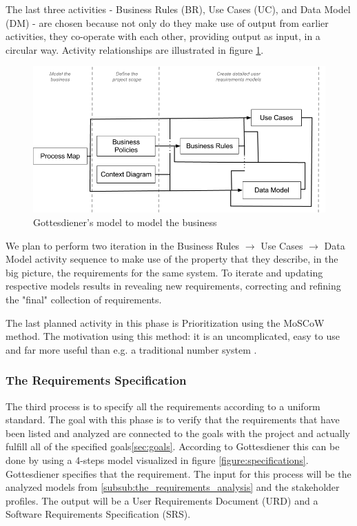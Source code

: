 \documentclass[a4paper]{article}
\begin{document}
     The last three activities - Business Rules (BR), Use Cases (UC), and Data Model (DM) - are chosen because not only do they make use of output from earlier activities, they co-operate with each other, providing output as input, in a circular way. Activity relationships are illustrated in figure \ref{figure:business}.
     
\begin{figure}[H]
	\centering
		\includegraphics[width=1\textwidth]{images/model_the_business.png}
	\caption{Gottesdiener's model to model the business \cite{gott4}}
	\label{figure:business}
\end{figure}
     
We plan to perform two iteration in the Business Rules $\rightarrow$ Use Cases $\rightarrow$ Data Model activity sequence to make use of the property that they describe, in the big picture, the requirements for the same system. To iterate and updating respective models results in revealing new requirements, correcting and refining the "final" collection of requirements.

The last planned activity in this phase is Prioritization using the MoSCoW method. The motivation using this method: it is an uncomplicated, easy to use and far more useful than e.g. a traditional number system \cite{coleyconsulting}.

\subsubsection{The Requirements Specification}
\label{subsub:the_requirements_specification}

The third process is to specify all the requirements according to a uniform standard. The goal with this phase is to verify that the requirements that have been listed and analyzed are connected to the goals with the project and actually fulfill all of the specified goals\ref{sec:goals}. According to Gottesdiener \cite{gott5} this can be done by using a 4-steps model visualized in figure \ref{figure:specifications}. Gottesdiener specifies that the requirement. The input for this process will be the analyzed models from \ref{subsub:the_requirements_analysis} and the stakeholder profiles. The output will be a User Requirements Document (URD) and a Software Requirements Specification (SRS).
\end{document}
